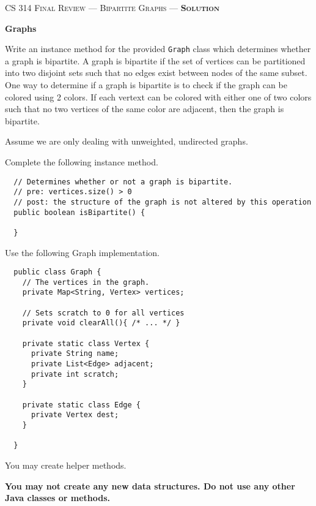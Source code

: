 \documentclass[12pt,letter]{article}
\begin{document}
\noindent\textsc{\large CS 314 Final Review --- Bipartite Graphs --- \textbf{Solution}}

\vspace{6pt}
\noindent\textbf{Graphs}

\vspace{2pt}
\noindent Write an instance method for the provided \texttt{Graph} class which determines whether a graph is bipartite.
A graph is bipartite if the set of vertices can be partitioned into two disjoint sets such that no edges exist between nodes of the same subset.
One way to determine if a graph is bipartite is to check if the graph can be colored using 2 colors. If each vertext can be colored
with either one of two colors such that no two vertices of the same color are adjacent, then the graph is bipartite. 

\vspace{4pt} Assume we are only dealing with unweighted, undirected graphs.

\vspace{4pt}
\noindent Complete the following instance method.
\begin{verbatim}
  // Determines whether or not a graph is bipartite.
  // pre: vertices.size() > 0
  // post: the structure of the graph is not altered by this operation
  public boolean isBipartite() {

  }
\end{verbatim}

\vspace{4pt}
\noindent Use the following Graph implementation.

\begin{verbatim}
  public class Graph {
    // The vertices in the graph.
    private Map<String, Vertex> vertices;

    // Sets scratch to 0 for all vertices
    private void clearAll(){ /* ... */ }

    private static class Vertex {
      private String name;
      private List<Edge> adjacent;
      private int scratch;
    }

    private static class Edge {
      private Vertex dest;
    }    

  }
\end{verbatim}

\noindent You may create helper methods.

\noindent \textbf{You may not create any new data structures. \newline Do not use any other Java classes or methods.}
\end{document}
